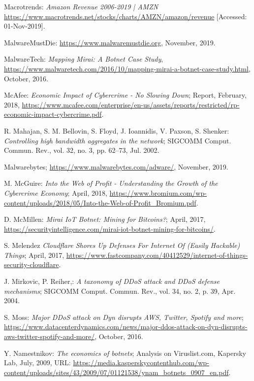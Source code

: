 \begin{thebibliography}{99}
 Macrotrends: \emph{Amazon Revenue 2006-2019 | AMZN} \url{https://www.macrotrends.net/stocks/charts/AMZN/amazon/revenue} [Accessed: 01-Nov-2019].

 MalwareMustDie: \url{https://www.malwaremustdie.org}, November, 2019.

 MalwareTech: \emph{Mapping Mirai: A Botnet Case Study}, \url{https://www.malwaretech.com/2016/10/mapping-mirai-a-botnet-case-study.html}, October, 2016.

 McAfee: \emph{Economic Impact of Cybercrime - No Slowing Down}; Report, February, 2018, \url{https://www.mcafee.com/enterprise/en-us/assets/reports/restricted/rp-economic-impact-cybercrime.pdf}.

 R. Mahajan, S. M. Bellovin, S. Floyd, J. Ioannidis, V. Paxson, S. Shenker: \emph{Controlling high bandwidth aggregates in the network}; SIGCOMM Comput. Commun. Rev., vol. 32, no. 3, pp. 62--73, Jul. 2002.

 Malwarebytes; \url{https://www.malwarebytes.com/adware/}, November, 2019.

 M. McGuire: \emph{Into the Web of Profit - Understanding the Growth of the Cybercrime Economy}; April, 2018, \url{https://www.bromium.com/wp-content/uploads/2018/05/Into-the-Web-of-Profit_Bromium.pdf}.

 D. McMillen: \emph{Mirai IoT Botnet: Mining for Bitcoins?}; April, 2017, \url{https://securityintelligence.com/mirai-iot-botnet-mining-for-bitcoins/}.

 S. Melendez \emph{Cloudflare Shores Up Defenses For Internet Of (Easily Hackable) Things}; April, 2017, \url{https://www.fastcompany.com/40412529/internet-of-things-security-cloudflare}.

 J. Mirkovic, P. Reiher,: \emph{A taxonomy of DDoS attack and DDoS defense mechanisms}; SIGCOMM Comput. Commun. Rev., vol. 34, no. 2, p. 39, Apr. 2004.

 S. Moss: \emph{Major DDoS attack on Dyn disrupts AWS, Twitter, Spotify and more}; \url{https://www.datacenterdynamics.com/news/major-ddos-attack-on-dyn-disrupts-aws-twitter-spotify-and-more/}, October, 2016.

 Y. Namestnikov: \emph{The economics of botnets}; Analysis on Viruslist.com, Kapersky Lab, July, 2009, URL: \url{https://media.kasperskycontenthub.com/wp-content/uploads/sites/43/2009/07/01121538/ynam_botnets_0907_en.pdf}.


\end{thebibliography}
